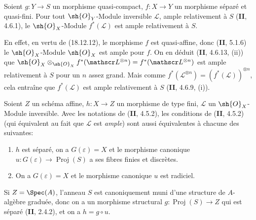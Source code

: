 \begin{proposition}[18.12.16]
\label{IV.18.12.16}
Soient $g:Y\to S$ un morphisme quasi-compact, $f:X\to Y$ un morphisme séparé et quasi-fini. Pour tout $\sh{O}_Y$-Module inversible $\mathscr L$, ample relativement à $S$ \textup{(\textbf{II}, 4.6.1)}, le $\sh{O}_X$-Module $f^*(\mathscr L)$ est ample relativement à $S$.
\end{proposition}

En effet, en vertu de (18.12.12), le morphisme $f$ est quasi-affine, donc (\textbf{II}, 5.1.6) le $\sh{O}_X$-Module $\sh{O}_X$ est ample pour $f$. On en déduit (\textbf{II}, 4.6.13, (ii)) que $\sh{O}_X\otimes_{\sh{O}_X}f^*(\mathscr L^{\otimes n})=f^*(\mathscr L^{\otimes n})$ est ample relativement à $S$ pour un $n$ assez grand. Mais comme $f^*(\mathscr L^{\otimes n})=(f^*(\mathscr L))^{\otimes n}$, cela entraîne que $f^*(\mathscr L)$ est ample relativement à $S$ (\textbf{II}, 4.6.9, (i)).

\begin{corollary}[18.12.17]
\label{IV.18.12.17}
Soient $Z$ un schéma affine, $h:X\to Z$ un morphisme de type fini, $\mathscr L$ un $\sh{O}_X$-Module inversible. Avec les notations de \textup{(\textbf{II}, 4.5.2)}, les conditions de \textup{(\textbf{II}, 4.5.2)} \textup{(qui équivalent au fait que $\mathscr L$ est \emph{ample})} sont aussi équivalentes à chacune des suivantes:
\begin{enumerate}
  \item[\textup{b$''$)}] $h$ est séparé, on a $G(\varepsilon)=X$ et le morphisme canonique $u:G(\varepsilon)\to\operatorname{Proj}(S)$ a ses fibres finies et discrètes.
  \item[\textup{b$'''$)}] On a $G(\varepsilon)=X$ et le morphisme canonique $u$ est radiciel.
\end{enumerate}
\end{corollary}

Si $Z=\Spec(A)$, l'anneau $S$ est canoniquement muni d'une structure de $A$-algèbre graduée, donc on a un morphisme structural $g:\operatorname{Proj}(S)\to Z$ qui est séparé (\textbf{II}, 2.4.2), et on a $h=g\circ u$.

